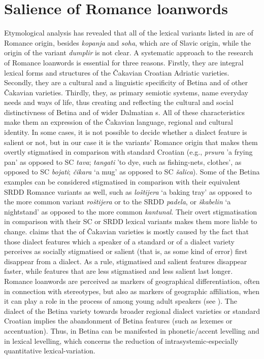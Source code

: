 \documentclass[output=paper]{LSP/langsci}
\begin{document}
\section{Salience of Romance loanwords}
Etymological analysis has revealed that all of the lexical variants listed in  are of Romance origin, besides \textit{kopanja} and \textit{soha}, which are of Slavic origin, while the origin of the variant \textit{dumplir} is not clear. A systematic approach to the research of Romance loanwords is essential for three reasons. Firstly, they are integral lexical forms and structures of the Čakavian Croatian Adriatic varieties. Secondly, they are a cultural and a linguistic specificity of Betina and of other Čakavian varieties. Thirdly, they, as primary semiotic systems, name everyday needs and ways of life, thus creating and reflecting the cultural and social distinctivness of Betina and of wider Dalmatian s. All of these characteristics make them an expression of the Čakavian language, regional and cultural identity. In some cases, it is not possible to decide whether a dialect feature is salient or not, but in our case it is the variants’ Romance origin that makes them overtly stigmatised in comparison with standard Croatian (e.g., \textit{prsura} 'a frying pan' as opposed to SC \textit{tava}; \textit{tangati} 'to dye, such as fishing-nets, clothes’, as opposed to SC \textit{bojati}; \textit{čikara} ‘a mug’ as opposed to SC \textit{šalica}). Some of the Betina examples can be considered stigmatised in comparison with their equivalent SRDD Romance variants as well, such as \textit{loštijera} ‘a baking tray’ as opposed to the more common variant \textit{roštijera} or to the SRDD \textit{padela}, or \textit{škabelin} ‘a nightstand’ as opposed to the more common \textit{kantunal}. Their overt stigmatisation in comparison with their SC or SRDD lexical variants makes them more liable to change. \citet[30--32]{jutronic_spliski_2010} claims that the  of Čakavian varieties is mostly caused by the fact that those dialect features which a speaker of a standard or of a dialect variety perceives as socially stigmatised or salient (that is, as some kind of error) first disappear from a dialect. As a rule, stigmatised and salient features disappear faster, while features that are less stigmatised and less salient last longer. Romance loanwords are perceived as markers of geographical differentiation, often in connection with stereotypes, but also as markers of geographic affiliation, when it can play a role in the process of  among young adult speakers (see \citealt[44--45]{auer_study_2004}). The dialect  of the Betina variety towards broader regional dialect varieties or standard Croatian implies the abandonment of Betina features (such as lexemes or accentuation). Thus,  in Betina can be manifested in phonetic/accent levelling and in lexical levelling, which concerns the reduction of intrasystemic-especially quantitative lexical-variation.
\end{document}
